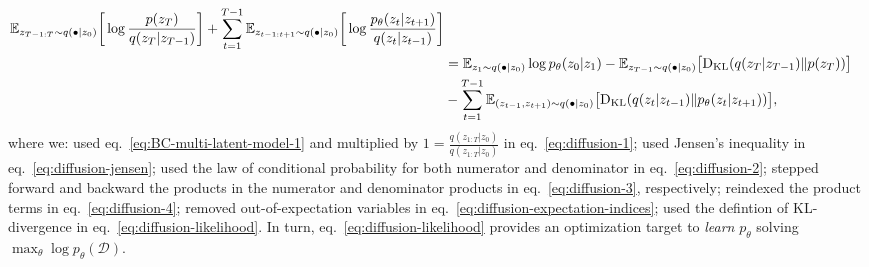 \begin{align}
        \mathbb{E}_{z_{T-1:T} \sim q(\bullet \vert z_0)} \bigg[ \log \frac{p (z_T)}{q(z_T \vert z_{T-1})} \bigg] +
        \sum_{t=1}^{T-1} \mathbb{E}_{z_{t-1:t+1} \sim q(\bullet \vert z_0)} \bigg[ \log \frac{p_\theta (z_{t} \vert z_{t+1})}{q(z_t \vert z_{t-1})}\bigg]
    \label{eq:diffusion-expectation-indices} \\
    &= \mathbb{E}_{z_1 \sim q(\bullet \vert z_0)} \log p_\theta (z_0 \vert z_1) - \mathbb{E}_{z_{T-1} \sim q(\bullet \vert z_0)} \big[ \text{D}_{\text{KL}} (q(z_T \vert z_{T-1}) \Vert p(z_T) ) \big] \label{eq:diffusion-likelihood} \\
    &- \sum_{t=1}^{T-1} \mathbb{E}_{(z_{t-1}, z_{t+1}) \sim q(\bullet \vert z_0)} \big[ \text{D}_{\text{KL}} (q(z_t \vert z_{t-1}) \Vert p_\theta(z_t \vert z_{t+1}) ) \big], \notag
\end{align}
where we: used eq.~\ref{eq:BC-multi-latent-model-1} and multiplied by \( 1 = \tfrac{q(z_{1:T} \vert z_0)}{q(z_{1:T} \vert z_0)} \) in eq.~\ref{eq:diffusion-1}; used Jensen's inequality in eq.~\ref{eq:diffusion-jensen}; used the law of conditional probability for both numerator and denominator in eq.~\ref{eq:diffusion-2}; stepped forward and backward the products in the numerator and denominator products in eq.~\ref{eq:diffusion-3}, respectively; reindexed the product terms in eq.~\ref{eq:diffusion-4}; removed out-of-expectation variables in eq.~\ref{eq:diffusion-expectation-indices}; used the defintion of KL-divergence in eq.~\ref{eq:diffusion-likelihood}.
In turn, eq.~\ref{eq:diffusion-likelihood} provides an optimization target to \emph{learn} \( p_\theta \) solving \( \max_\theta \log p_\theta (\mathcal D) \).

